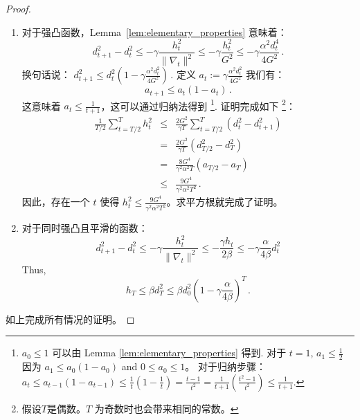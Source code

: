 \begin{proof}
\begin{enumerate}
\item
对于强凸函数，Lemma~\ref{lem:elementary_properties} 意味着：
\[ d_{t+1}^2 - d_t^2
  \leq - \gamma \frac{h_t^2}{\|\nabla_t\|^2}
  \leq - \gamma \frac{h_t^2}{G^2}
  \leq  - \gamma  \frac{\alpha^2 d_t^4 }{4 G^2} \, .
\]
换句话说：
$d_{t+1}^2  \leq  d_t^2 ( 1- \gamma \frac{\alpha^2 d_t^2}{4 G^2} ) \, .$ 
定义  $a_t :={\gamma}\frac{\alpha^2 d_t^2}{4 G^2}$ 我们有：
\[
a_{t+1}  \leq  a_t (1-a_t) \, .
\]
这意味着 $a_t\leq\frac{1}{t+1}$，这可以通过归纳法得到
\footnote{
$a_0\leq 1$ 可以由  Lemma \ref{lem:elementary_properties} 得到. 对于 $t=1$, $a_1\leq \frac{1}{2}$ 因为  $a_1  \leq  a_0 (1-a_0)$ and $0\leq a_0\leq 1$。
对于归纳步骤：
  $ a_t  \leq  a_{t-1} (1-a_{t-1}) \leq
  \frac{1}{t}(1-\frac{1}{t})
  =\frac{t-1}{t^2}=\frac{1}{t+1}(\frac{t^2-1}{t^2})
  \leq \frac{1}{t+1}$.}. 
证明完成如下 \footnote{假设$T$是偶数。$T$ 为奇数时也会带来相同的常数。}：
\begin{eqnarray*}
\frac{1}{ T/2 } \sum_{t= T/2 }^T h_t^2 &
\leq& \frac{2G^2}{\gamma  T  }\sum_{t= T/2 }^T ( d_t^2 -
                                   d_{t+1}^2)  \\
  &=&\frac{2 G^2}{\gamma  T } ( d _{ T/2 }^2 - d_T^2)  \\
  &=&\frac{8 G^4}{ \gamma^2 \alpha^2   T} ( a
    _{ T/2 } - a_T)  \\ 
   & \leq &\frac{9 G^4}{\gamma^2 \alpha^2 T ^2} 
  \, .
\end{eqnarray*}
因此，存在一个  $t$ 使得  $h_t^2 \leq \frac{ 9 G^4}{\gamma^2 \alpha^2 T^2} $。求平方根就完成了证明。

\item
对于同时强凸且平滑的函数：
\[ d_{t+1}^2 - d_t^2 \leq - \gamma \frac{h_t^2}{\|\nabla_t\|^2} \leq
 - \frac{\gamma h_t}{2 \beta} \leq
  - \gamma \frac{\alpha}{4\beta} d_t^2
  \]
  Thus,
  \[
    h_{T} \leq \beta d_{T}^2 \leq \beta d_0^2
    \left(1-\gamma\frac{\alpha}{4 \beta}\right)^T\, .
    \]
  \end{enumerate}
如上完成所有情况的证明。
\end{proof}













